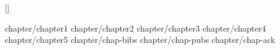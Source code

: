 \documentclass[12pt,a4paper,fancyhdr,hyperref,fntef]{ctexbook}
\begin{document}
\frontmatter

%




\pagestyle{plain} 
\def\thepage{\xiaowuzi\roman{page}}



{
\titleformat{\chapter}[hang]{\vspace{-1.8cm}\chapterfmt}{\chaptername}{1em}{}[\vspace{-1cm}] %
\baselineskip=20pt
\tableofcontents
}

\clearpage

\mainmatter

\setcounter{page}{1}
\setcounter{chapter}{0}
\def\thepage{\xiaowuzi\arabic{page}}

 {chapter/chapter1}
 {chapter/chapter2}
 {chapter/chapter3}
 {chapter/chapter4}
 {chapter/chapter5}
 {chapter/chap-bibs}
 {chapter/chap-pubs}
 {chapter/chap-ack}
\end{document}
